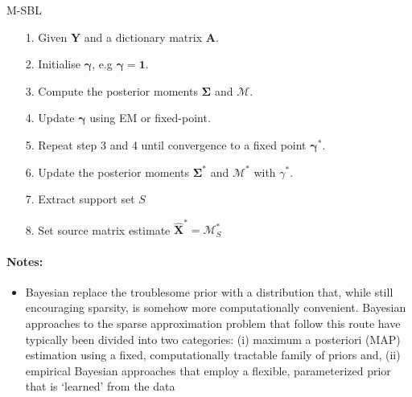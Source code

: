 \begin{algorithm}[H]
\caption{M-SBL}
\begin{itemize}
\item[1.] Given $\mathbf{Y}$ and a dictionary matrix $\mathbf{A}$.
\item[2.] Initialise $\boldsymbol{\gamma}$, e.g $\boldsymbol{\gamma} = \mathbf{1}$.
\item[3.] Compute the posterior moments $\boldsymbol{\Sigma}$ and $\mathcal{M}$.
\item[4.] Update $\boldsymbol{\gamma}$ using EM or fixed-point.
\item[5.] Repeat step 3 and 4 until convergence to a fixed point $\boldsymbol{\gamma}^\ast$.
\item[6.] Update the posterior moments $\boldsymbol{\Sigma}^\ast$ and $\mathcal{M}^\ast$ with $\gamma^\ast$.
\item[7.] Extract support set $S$
\item[8.] Set source matrix estimate $\hat{\mathbf{X}}^\ast = \mathcal{M}^\ast_S$
\end{itemize}
\end{algorithm}

\paragraph{Notes:}
\begin{itemize}
\item Bayesian replace the troublesome prior with a distribution that, while still encouraging sparsity, is somehow more computationally convenient. Bayesian approaches to the sparse approximation problem that follow this route have typically been divided into two categories: (i) maximum a posteriori (MAP) estimation using a fixed, computationally tractable family of priors and, (ii) empirical Bayesian approaches that employ a flexible, parameterized prior that is ‘learned’ from the data
\end{itemize}